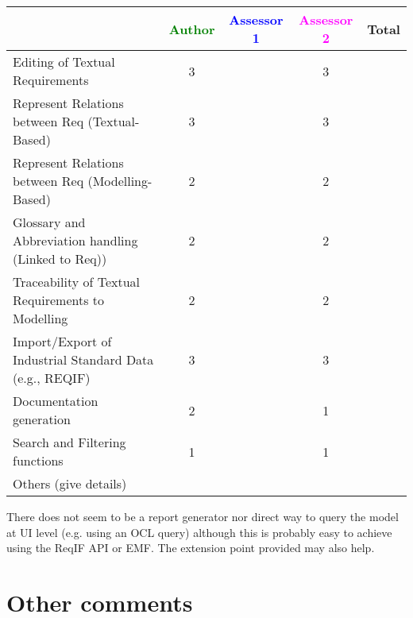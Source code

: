 \begin{tabular}{|l | c | c | c | c|}
\hline
& \textcolor{green}{Author} & \textcolor{blue}{Assessor 1} & \textcolor{magenta}{Assessor 2} & Total \\
\hline
Editing of Textual Requirements & 3 & & 3 &  \\
\hline
Represent Relations between Req (Textual-Based) & 3 & & 3 & \\
\hline
Represent Relations between Req (Modelling-Based) & 2 & & 2 & \\
\hline
Glossary and Abbreviation handling (Linked to Req)) & 2 & & 2 & \\
\hline
Traceability of Textual Requirements to Modelling & 2 & & 2 & \\
\hline
Import/Export of Industrial Standard Data (e.g., REQIF) & 3 & & 3 & \\
\hline
Documentation generation & 2 & & 1 &  \\
\hline
Search and Filtering functions & 1 & & 1 & \\
\hline
Others (give details) & & & & \\
\hline
\end{tabular}

\begin{assessor2}
There does not seem to be a report generator nor direct way to query the model at UI level (e.g. using an OCL query) although this is probably easy to achieve using the ReqIF API or EMF. The extension point provided may also help.
\end{assessor2}


\section{Other comments}



\begin{comment}
This section is available for the author or the assessors to  complete the description and criteria.
\end{comment}




